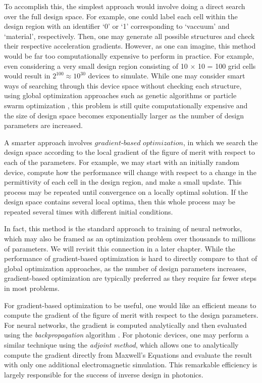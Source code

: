To accomplish this, the simplest approach would involve doing a direct search over the full design space.
For example, one could label each cell within the design region with an identifier `0' or `1' corresponding to `vaccuum' and `material', respectively.
Then, one may generate all possible structures and check their respective acceleration gradients.
However, as one can imagine, this method would be far too computationally expensive to perform in practice.
For example, even considering a very small design region consisting of 10 $\times$ 10 = 100 grid cells would result in $2^{100} \approx 10^{30}$ devices to simulate.
While one may consider smart ways of searching through this device space without checking each structure, using global optimization approaches such as genetic algorithms \cite{whitley_genetic_1994} or particle swarm optimization \cite{noauthor_particle_nodate}, this problem is still quite computationally expensive and the size of design space becomes exponentially larger as the number of design parameters are increased.

A smarter approach involves $\textit{gradient-based optimization}$, in which we search the design space according to the local gradient of the figure of merit with respect to each of the parameters.
For example, we may start with an initially random device, compute how the performance will change with respect to a change in the permittivity of each cell in the design region, and make a small update.
This process may be repeated until convergence on a locally optimal solution.
If the design space contains several local optima, then this whole process may be repeated several times with different initial conditions.

In fact, this method is the standard approach to training of neural networks, which may also be framed as an optimization problem over thousands to millions of parameters.
We will revisit this connection in a later chapter.
While the performance of gradient-based optimization is hard to directly compare to that of global optimization approaches, as the number of design parameters increases, gradient-based optimization are typically preferred as they require far fewer steps in most problems.

For gradient-based optimization to be useful, one would like an efficient means to compute the gradient of the figure of merit with respect to the design parameters.
For neural networks, the gradient is computed analytically and then evaluated using the \textit{backpropagation} algorithm \cite{rumelhart_learning_1985}.
For photonic devices, one may perform a similar technique using the \textit{adjoint method}, which allows one to analytically compute the gradient directly from Maxwell's Equations and evaluate the result with only one additional electromagnetic simulation.
This remarkable efficiency is largely responsible for the success of inverse design in photonics.

